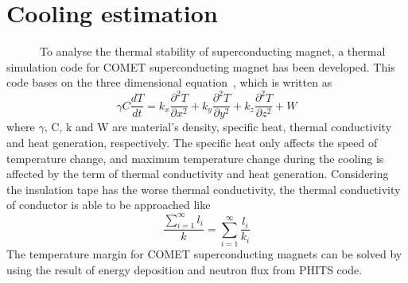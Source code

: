  \section{Cooling estimation}
~~~~~~To analyse the thermal stability of superconducting magnet, a thermal simulation code for COMET superconducting magnet has been developed.
This code bases on the three dimensional equation~\cite{heat}, which is written as
\begin{equation}
 \gamma C \frac{dT}{dt} = k_x \frac{\partial^2 T}{\partial x^2} + k_y \frac{\partial^2 T}{\partial y^2} + k_z \frac{\partial^2 T}{\partial z^2} + W
\end{equation}
where $\gamma$, C, k and W are material's density, specific heat, thermal conductivity and heat generation, respectively.
The specific heat only affects the speed of temperature change, and maximum temperature change during the cooling is affected by the term of thermal conductivity and heat generation.
Considering the insulation tape has the worse thermal conductivity, the thermal conductivity of conductor is able to be approached like
\begin{equation}
 \frac{\sum^{\infty}_{i=1}l_i}{k} = \sum^{\infty}_{i=1} \frac{l_i}{k_i}
\end{equation}
The temperature margin for COMET superconducting magnets can be solved by using the result of energy deposition and neutron flux from PHITS code.

